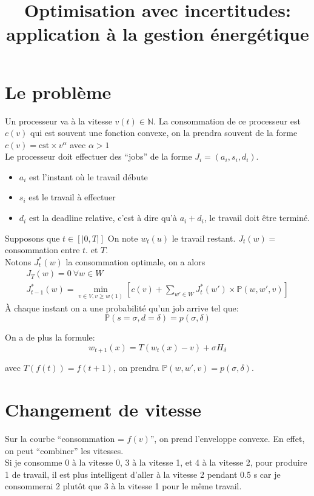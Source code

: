 \documentclass[10pt,a4paper]{article}
\title{Optimisation avec incertitudes: application à la gestion énergétique}
\begin{document}
\maketitle

\section{Le problème}
Un processeur va à la vitesse $v(t)\in \mathbb{N}$. La consommation de
ce processeur est $c(v)$ qui est souvent une fonction convexe, on la
prendra souvent de la forme $c(v)=\mbox{cst}\times v^\alpha$ avec
$\alpha>1$\\
Le processeur doit effectuer des ``jobs'' de la forme $J_i=(a_i, s_i,
d_i)$.
\begin{itemize}
\item $a_i$ est l'instant où le travail débute
\item $s_i$ est le travail à effectuer
\item $d_i$ est la deadline relative, c'est à dire qu'à $a_i+d_i$, le
  travail doit être terminé.
\end{itemize}
Supposons que $t\in [|0,T|]$
On note $w_t(u)$ le travail restant. $J_t(w)=$ consommation entre $t$.
et $T$.\\

Notons $J_t^*(w)$ la consommation optimale, on a alors\\

\begin{equation}
  \begin{array}{l}
    J_T(w)=0~\forall w\in W\\
    J_{t-1}^*(w)=\min\limits_{v\in V, v\geq w(1)}[c(v)+\sum_{w'\in
    W}J_t^*(w')\times\mathbb{P}(w,w',v)]
    
  \end{array}
\end{equation}
À chaque instant on a une probabilité qu'un job arrive tel que:
\begin{equation}
  \mathbb{P}(s=\sigma, d=\delta)=p(\sigma,\delta)  
\end{equation}

On a de plus la formule:
\begin{equation}
  w_{t+1}(x)=T(w_t(x)-v)+\sigma H_{\delta}
\end{equation}

avec $T(f(t))=f(t+1)$, on prendra $\mathbb{P}(w, w', v)=p(\sigma,
\delta)$.


\section{Changement de vitesse}
Sur la courbe ``consommation = $f(v)$'', on prend l'enveloppe
convexe. En effet, on peut ``combiner'' les vitesses.\\
Si je consomme 0 à la vitesse 0, 3 à la vitesse 1, et 4 à la vitesse
2, pour produire 1 de travail, il est plus intelligent d'aller à la
vitesse 2 pendant 0.5 s car je consommerai 2 plutôt que 3 à la vitesse
1 pour le même travail.
\end{document}
